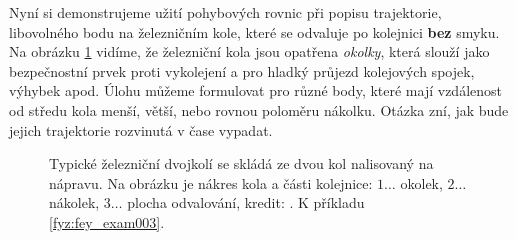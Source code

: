   
Nyní si demonstrujeme užití pohybových rovnic při popisu trajektorie, libovolného bodu na 
železničním kole, které se odvaluje po kolejnici \textbf{bez} smyku. Na obrázku \ref{fyz:fig142} 
vidíme, že železniční kola jsou opatřena \emph{okolky}, která slouží jako bezpečnostní prvek proti 
vykolejení a pro hladký průjezd kolejových spojek, výhybek apod. Úlohu můžeme formulovat pro různé 
body, které mají vzdálenost od středu kola menší, větší, nebo rovnou poloměru nákolku. Otázka zní, 
jak bude jejich trajektorie rozvinutá v čase vypadat.

\begin{figure}[ht!]  %
  \centering
  \caption{Typické železniční dvojkolí se skládá ze dvou kol nalisovaný na nápravu. Na obrázku je
          nákres kola a části kolejnice: \(1\ldots\) okolek, \(2\ldots\) nákolek, \(3\ldots\) plocha
          odvalování, kredit: \wikiOkolek. K příkladu \ref{fyz:fey_exam003}.}
  \label{fyz:fig142}
\end{figure}

